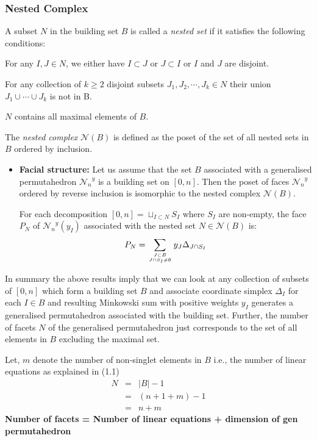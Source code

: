 \documentclass[hidelinks,12pt]{article}
\newcommand{\bea}[1]{\begin{eqnarray}\label{#1} }
\newcommand{\eea}{\end{eqnarray}}
\def\bea{\begin{eqnarray}}
\def\eea{\end{eqnarray}}
\begin{document}
\subsubsection*{Nested Complex}
A subset $N$ in the building set $B$ is called a {\it nested set} if it satisfies the following conditions:
\begin{compactenum}[\quad (1)]
    \item For any $I,J \in N$, we either have $I \subset J$ or $J\subset I$ or $I$ and $J$ are disjoint.
    \item For any collection of $k \geq 2$ disjoint subsets $J_1,J_2,\cdots, J_k \in N$ their union $J_1 \cup \cdots \cup J_k$ is not in B.
    \item $N$ contains all maximal elements of $B$.
\end{compactenum}
The {\it nested complex} $\mathcal{N}(B)$ is defined as the poset of the set of all nested sets in $B$ ordered by inclusion.

\begin{itemize}

\item {\bf Facial structure:} Let us assume that the set $B$ associated with a generalised permutahedron ${\mathscr N_n}^{y}$ is a building set on $[0,n]$. Then the poset of faces ${\mathscr N_n}^{y}$ ordered by reverse inclusion is isomorphic to the nested complex $\mathcal{N}(B)$. 

For each decomposition $[0,n]=  \sqcup_{I \subset N } S_I $ where $S_I$ are non-empty, the face $P_N$ of ${\mathscr N_n}^{y}(y_I)$ associated with the nested set $N \in \mathcal{N}(B)$ is:
\bea
P_N = \sum_{{J \subset B}\atop{J \cap S_I \neq \emptyset}} y_{J} \Delta_{J \cap S_I}
\eea
\end{itemize}

In summary the above results imply that we can look at any collection of subsets of $[0, n]$ which form a building set $B$ and associate  coordinate simplex $\Delta_I$ for each $I \in B$ and resulting Minkowski sum with positive weights $y_I$ generates a generalised permutahedron associated with the building set. Further, the number of facets $N$ of the generalised permutahedron just corresponds to the set of all elements in $B$ excluding the maximal set.  

Let, $m$ denote the number of non-singlet elements in $B$ i.e., the number of linear equations as explained in (1.1) 
\bea
N &=& |B|-1 \nonumber \\
 &=& (n+1+m)-1 \nonumber  \\
 &=& n+m \nonumber
\eea
{\bf Number of facets = Number of linear equations + dimension of  gen permutahedron}
 
\end{document}
